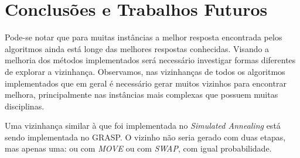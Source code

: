 \documentclass[11pt]{article}
\begin{document}


\section{Conclusões e Trabalhos Futuros}
\label{sec:conclusao}

Pode-se notar que para muitas instâncias a melhor resposta encontrada pelos algoritmos ainda está longe das melhores respostas conhecidas. Visando a melhoria dos métodos implementados será necessário investigar formas diferentes de explorar a vizinhança. Observamos, nas vizinhanças de todos os algoritmos implementados que em geral é necessário gerar muitos vizinhos para encontrar melhora, principalmente nas instâncias mais complexas que possuem muitas disciplinas.

Uma vizinhança similar à que foi implementada no \textit{Simulated Annealing} está sendo implementada no GRASP. O vizinho não seria gerado com duas etapas, mas apenas uma: ou com \textit{MOVE} ou com \textit{SWAP}, com igual probabilidade.
\end{document}
